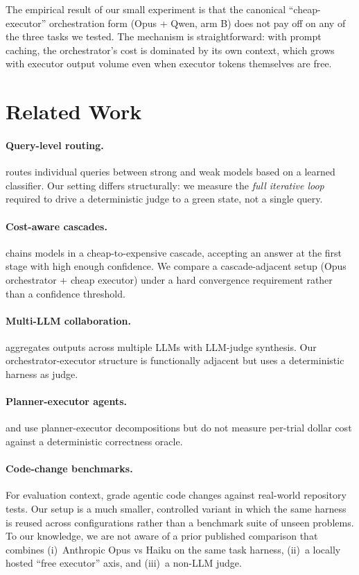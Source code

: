 \documentclass[11pt,a4paper]{article}
\begin{document}
The empirical result of our small experiment is that the canonical ``cheap-executor'' orchestration form (Opus + Qwen, arm B) does not pay off on any of the three tasks we tested. The mechanism is straightforward: with prompt caching, the orchestrator's cost is dominated by its own context, which grows with executor output volume even when executor tokens themselves are free.

\section{Related Work}

\paragraph{Query-level routing.}
\citet{ong2024routellm} routes individual queries between strong and weak models based on a learned classifier. Our setting differs structurally: we measure the \emph{full iterative loop} required to drive a deterministic judge to a green state, not a single query.

\paragraph{Cost-aware cascades.}
\citet{chen2023frugalgpt} chains models in a cheap-to-expensive cascade, accepting an answer at the first stage with high enough confidence. We compare a cascade-adjacent setup (Opus orchestrator + cheap executor) under a hard convergence requirement rather than a confidence threshold.

\paragraph{Multi-LLM collaboration.}
\citet{wang2024moa} aggregates outputs across multiple LLMs with LLM-judge synthesis. Our orchestrator-executor structure is functionally adjacent but uses a deterministic harness as judge.

\paragraph{Planner-executor agents.}
\citet{shen2023hugginggpt} and \citet{wang2023voyager} use planner-executor decompositions but do not measure per-trial dollar cost against a deterministic correctness oracle.

\paragraph{Code-change benchmarks.}
For evaluation context, \citet{jimenez2024swebench} grade agentic code changes against real-world repository tests. Our setup is a much smaller, controlled variant in which the same harness is reused across configurations rather than a benchmark suite of unseen problems. To our knowledge, we are not aware of a prior published comparison that combines (i)~Anthropic Opus vs Haiku on the same task harness, (ii)~a locally hosted ``free executor'' axis, and (iii)~a non-LLM judge.
\end{document}
